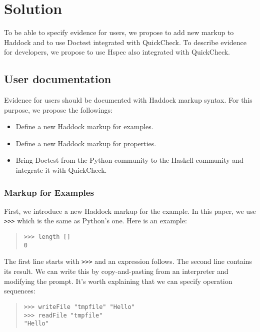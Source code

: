 \documentclass[preprint]{sigplanconf}
\begin{document}
\section{Solution}

To be able to specify evidence for users, we propose to add new
markup to Haddock and to use Doctest integrated with QuickCheck. To
describe evidence for developers, we propose to use Hspec also
integrated with QuickCheck.

\subsection{User documentation}
\label{sec:user-doc}

Evidence for users should be documented with Haddock markup syntax.
For this purpose, we propose the followings:

\begin{itemize}
\item Define a new Haddock markup for examples.
\item Define a new Haddock markup for properties.
\item Bring Doctest from the Python community to the Haskell
community and integrate it with QuickCheck.
\end{itemize}

\subsubsection{Markup for Examples}

\noindent First, we introduce a new Haddock markup for the example.
In this paper, we use {\tt >>>} which is the same as Python's one.
Here is an example:

\begin{quote}
\small
\begin{verbatim}
>>> length []
0
\end{verbatim}
\end{quote}

\noindent The first line starts with {\tt >>>} and an expression follows. The second line contains its result. We can write this by copy-and-pasting from an interpreter and modifying the prompt.
It's worth explaining that we can specify operation sequences:

\begin{quote}
\small
\begin{verbatim}
>>> writeFile "tmpfile" "Hello"
>>> readFile "tmpfile"
"Hello"
\end{verbatim}
\end{quote}
\end{document}
